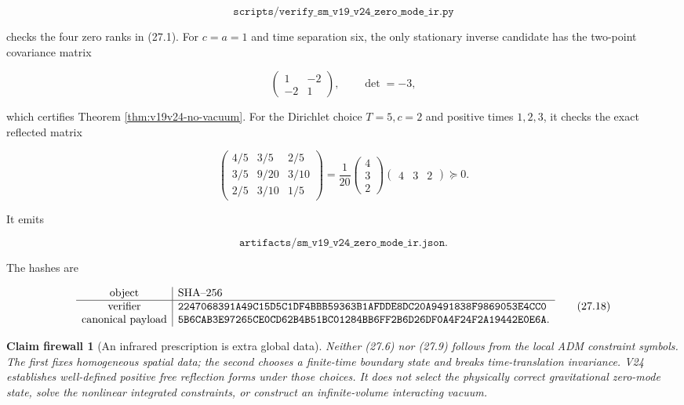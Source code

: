 \documentclass[11pt]{article}
\newtheorem{firewall}[theorem]{Claim firewall}
\theoremstyle{remark}
\begin{document}
\[
 \texttt{scripts/verify\_sm\_v19\_v24\_zero\_mode\_ir.py}      \tag{27.14}
\]

checks the four zero ranks in (27.1).  For \(c=a=1\) and time separation
six, the only stationary inverse candidate has the two-point covariance
matrix

\[
 \begin{pmatrix}1&-2\\-2&1\end{pmatrix},
 \qquad \det=-3,                                               \tag{27.15}
\]

which certifies Theorem \ref{thm:v19v24-no-vacuum}.  For the Dirichlet
choice \(T=5,c=2\) and positive times \(1,2,3\), it checks the exact
reflected matrix

\[
 \begin{pmatrix}
 4/5&3/5&2/5\\
 3/5&9/20&3/10\\
 2/5&3/10&1/5
 \end{pmatrix}
 =\frac1{20}
 \begin{pmatrix}4\\3\\2\end{pmatrix}
 \begin{pmatrix}4&3&2\end{pmatrix}\succeq0.                  \tag{27.16}
\]

It emits

\[
 \texttt{artifacts/sm\_v19\_v24\_zero\_mode\_ir.json}.         \tag{27.17}
\]

The hashes are

\[
\begin{array}{c|l}
\hbox{object}&\hbox{SHA--256}\\ \hline
\hbox{verifier}&
\texttt{2247068391A49C15D5C1DF4BBB59363B1AFDDE8DC20A9491838F9869053E4CC0}\\
\hbox{canonical payload}&
\texttt{5B6CAB3E97265CE0CD62B4B51BC01284BB6FF2B6D26DF0A4F24F2A19442E0E6A}.
\end{array}                                                     \tag{27.18}
\]

\begin{firewall}[An infrared prescription is extra global data]
\label{fire:v19v24}
Neither (27.6) nor (27.9) follows from the local ADM constraint symbols.
The first fixes homogeneous spatial data; the second chooses a finite-time
boundary state and breaks time-translation invariance.  V24 establishes
well-defined positive free reflection forms under those choices.  It does
not select the physically correct gravitational zero-mode state, solve
the nonlinear integrated constraints, or construct an infinite-volume
interacting vacuum.
\end{firewall}
\end{document}
